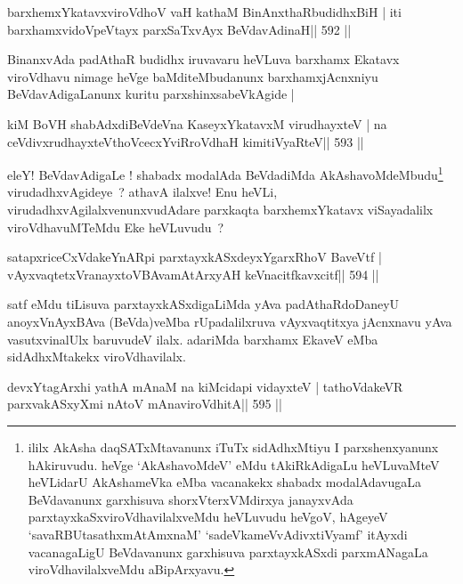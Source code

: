 

\begin{shl}
barxhemxYkatavxviroVdhoV vaH kathaM BinAnxthaRbudidhxBiH |
iti barxhamxvidoVpeVtayx parxSaTxvAyx BeVdavAdinaH\hfill || 592 ||
\end{shl}

\begin{artha}
BinanxvAda padAthaR budidhx iruvavaru heVLuva barxhamx Ekatavx
viroVdhavu nimage heVge baMditeMbudanunx barxhamxjAcnxniyu
BeVdavAdigaLanunx kuritu parxshinxsabeVkAgide |
\end{artha}

\begin{shl}
kiM BoVH shabAdxdiBeVdeVna KaseyxYkatavxM virudhayxteV |
na ceVdivxrudhayxteV\s thoVcecxYviRroVdhaH kimitiVyaRteV\hfill || 593 ||
\end{shl}

\begin{artha}
eleY! BeVdavAdigaLe ! shabadx modalAda BeVdadiMda
AkAshavoMdeMbudu\footnote{ililx AkAsha daqSATxMtavanunx iTuTx
  sidAdhxMtiyu I parxshenxyanunx hAkiruvudu. heVge `AkAshavoMdeV' eMdu
  tAkiRkAdigaLu heVLuvaMteV heVLidarU AkAshameVka eMba vacanakekx
  shabadx modalAdavugaLa BeVdavanunx garxhisuva shorxVterxVMdirxya
  janayxvAda parxtayxkaSxviroVdhavilalxveMdu heVLuvudu heVgoV, hAgeyeV
  `savaRBUtasathxmAtAmxnaM' `sadeVkameVvAdivxtiVyamf' itAyxdi
  vacanagaLigU BeVdavanunx garxhisuva parxtayxkASxdi parxmANagaLa
  viroVdhavilalxveMdu aBipArxyavu.} virudadhxvAgideye~? athavA ilalxve! Enu
heVLi, virudadhxvAgilalxvenunxvudAdare parxkaqta barxhemxYkatavx
viSayadalilx viroVdhavuMTeMdu Eke heVLuvudu~?
\end{artha}

\begin{shl}
satapxriceCxVdakeYnARpi parxtayxkASxdeyxYgarxRhoV BaveVtf |
vAyxvaqtetxVranayxtoVBAvamAtArxyAH keVnacitfkavxcitf\hfill || 594 ||
\end{shl}

\begin{artha}
satf eMdu tiLisuva parxtayxkASxdigaLiMda yAva padAthaRdoDaneyU anoyxVnAyxBAva (BeVda)veMba rUpadalilxruva vAyxvaqtitxya jAcnxnavu yAva vasutxvinalUlx baruvudeV ilalx. adariMda barxhamx EkaveV eMba sidAdhxMtakekx viroVdhavilalx.
\end{artha}

\begin{shl}
devxYtagArxhi yathA mAnaM na kiMcidapi vidayxteV |
tathoVdakeVR parxvakASxyXmi nAtoV mAnaviroVdhitA\hfill || 595 ||
\end{shl}

